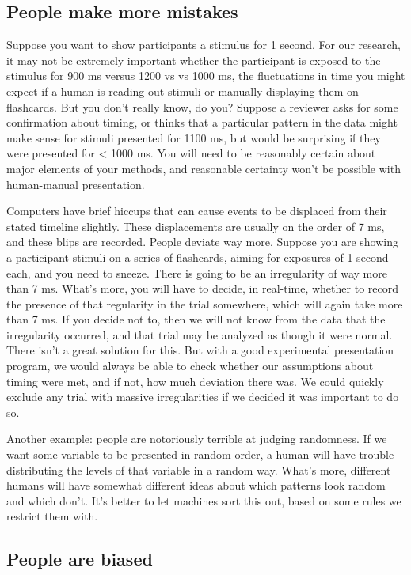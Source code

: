 \documentclass[12pt,]{book}
\theoremstyle{definition}
\theoremstyle{definition}
\theoremstyle{definition}
\theoremstyle{remark}
\begin{document}
\subsection{People make more mistakes}\label{people-make-more-mistakes}

Suppose you want to show participants a stimulus for 1 second. For our
research, it may not be extremely important whether the participant is
exposed to the stimulus for 900 ms versus 1200 vs vs 1000 ms, the
fluctuations in time you might expect if a human is reading out stimuli
or manually displaying them on flashcards. But you don't really know, do
you? Suppose a reviewer asks for some confirmation about timing, or
thinks that a particular pattern in the data might make sense for
stimuli presented for 1100 ms, but would be surprising if they were
presented for \textless{} 1000 ms. You will need to be reasonably
certain about major elements of your methods, and reasonable certainty
won't be possible with human-manual presentation.

Computers have brief hiccups that can cause events to be displaced from
their stated timeline slightly. These displacements are usually on the
order of 7 ms, and these blips are recorded. People deviate way more.
Suppose you are showing a participant stimuli on a series of flashcards,
aiming for exposures of 1 second each, and you need to sneeze. There is
going to be an irregularity of way more than 7 ms. What's more, you will
have to decide, in real-time, whether to record the presence of that
regularity in the trial somewhere, which will again take more than 7 ms.
If you decide not to, then we will not know from the data that the
irregularity occurred, and that trial may be analyzed as though it were
normal. There isn't a great solution for this. But with a good
experimental presentation program, we would always be able to check
whether our assumptions about timing were met, and if not, how much
deviation there was. We could quickly exclude any trial with massive
irregularities if we decided it was important to do so.

Another example: people are notoriously terrible at judging randomness.
If we want some variable to be presented in random order, a human will
have trouble distributing the levels of that variable in a random way.
What's more, different humans will have somewhat different ideas about
which patterns look random and which don't. It's better to let machines
sort this out, based on some rules we restrict them with.

\subsection{People are biased}\label{people-are-biased}
\end{document}

